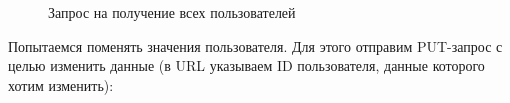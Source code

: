 \documentclass[coursework]{SCWorks}
\begin{document}
\begin{figure}[H]
	\caption{Запрос на получение всех пользователей}
	\label{pic6}
\end{figure}

Попытаемся поменять значения пользователя. Для этого отправим PUT-запрос с
целью изменить данные (в URL указываем ID пользователя, данные которого
хотим изменить): 
\end{document}
